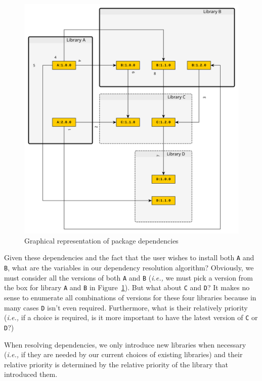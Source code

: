 \documentclass[11pt,a4paper,twocolumn]{article}
\newcommand{\code}[1]{\texttt{#1}} %
\begin{document}
\begin{figure}[!ht]
  \centering
  \includegraphics[width=\columnwidth]{fig/complex_case}
  \caption{Graphical representation of package dependencies}\label{fig:deps}
\end{figure}

Given these dependencies and the fact that the user wishes to install
both \code{A} and \code{B}, what are the variables in our dependency
resolution algorithm?  Obviously, we must consider all the versions of
both \code{A} and \code{B} ({\it i.e.,} we must pick a version from
the box for library \code{A} and \code{B} in Figure~\ref{fig:deps}).
But what about \code{C} and \code{D}?  It makes no sense to enumerate
all combinations of versions for these four libraries because in many
cases \code{D} isn't even required.  Furthermore, what is their
relatively priority (\emph{i.e.,} if a choice is required, is it more
important to have the latest version of \code{C} or \code{D}?)

When resolving dependencies, we only introduce new libraries when
necessary (\emph{i.e.,} if they are needed by our current choices of
existing libraries) and their relative priority is determined by the
relative priority of the library that introduced them.
\end{document}
